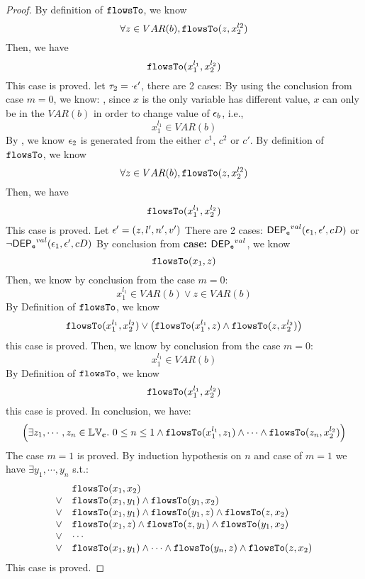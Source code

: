 \begin{proof}
 By definition of $\mathtt{flowsTo}$, we know
 \[
 \forall z \in VAR(b), \mathtt{flowsTo}(z, x_2^{l2})
 \]
 Then, we have
 \[
 \mathtt{flowsTo}(x_1^{l_1}, x_2^{l_2})
 \]
 This case is proved.
%
 let $\mathtt{\tau}_2 = \cdot \mathtt{\epsilon}'$, there are 2 cases:
By using the conclusion from case $m = 0$, we know:
, since $x$ is the only variable has different value, $x$ can only be in the $VAR(b)$ in order to change value of $\mathtt{\epsilon}_b$, i.e.,
 \[
 x_1^{l_1} \in VAR(b)
 \]
 By , we know $\mathtt{\epsilon}_2$ is generated from the either $c^1$, $c^2$ or $c'$.
 By definition of $\mathtt{flowsTo}$, we know
 \[
 \forall z \in VAR(b), \mathtt{flowsTo}(z, x_2^{l2})
 \]
 Then, we have
 \[
 \mathtt{flowsTo}(x_1^{l_1}, x_2^{l_2})
 \]
  This case is proved.
%
Let $\mathtt{\epsilon}' = (z, l', n', v')$
There are 2 cases:
$\mathsf{DEP_{\mathtt{e}}}^{val}(\mathtt{\epsilon}_1, \mathtt{\epsilon}', c D)$ or $\neg \mathsf{DEP_{\mathtt{e}}}^{val}(\mathtt{\epsilon}_1, \mathtt{\epsilon}', c D)$
%
%
By conclusion from \textbf{case: $\mathsf{DEP_{\mathtt{e}}}^{val}$}, we know
\[
  \mathtt{flowsTo}(x_1, z)
\]
Then, we know by conclusion from the case $m = 0$:
\[
  x_1^{l_1} \in VAR(b) \lor z \in VAR(b)
\]
%
By Definition of $\mathtt{flowsTo}$, we know
\[
  \mathtt{flowsTo}(x_1^{l_1}, x_2^{l_2}) \lor 
  \big(\mathtt{flowsTo}(x_1^{l_1}, z) \land \mathtt{flowsTo}(z, x_2^{l_2}) \big)
\]
this case is proved.
%
Then, we know by conclusion from the case $m = 0$:
\[
  x_1^{l_1} \in VAR(b)
\]
%
By Definition of $\mathtt{flowsTo}$, we know
\[
  \mathtt{flowsTo}(x_1^{l_1}, x_2^{l_2}) 
\]
this case is proved.
%
In conclusion, we have:
\[
  \Big( \exists z_1, \cdots, z_n \in \mathbb{LV}_{{\boldsymbol{\mathbf{c}}}}. ~ 0 \leq n \leq 1 \land
  \mathtt{flowsTo}(x_1^{l_1}, z_1) 
  \land \cdots \land \mathtt{flowsTo}(z_n, x_2^{l_2}) \Big)
\]
The case $m = 1$ is proved.
%
By induction hypothesis on $n$ and case of $m = 1$ we have $\exists y_1, \cdots, y_n$ s.t.:
\[
\begin{array}{ll}
      & \mathtt{flowsTo}(x_1, x_2) \\
  \lor  & \mathtt{flowsTo}(x_1, y_1) \land \mathtt{flowsTo}(y_1, x_2)\\
  \lor  & \mathtt{flowsTo}(x_1, y_1) \land \mathtt{flowsTo}(y_1, z) \land \mathtt{flowsTo}(z, x_2) \\
  \lor  & \mathtt{flowsTo}(x_1, z) \land \mathtt{flowsTo}(z, y_1) \land \mathtt{flowsTo}(y_1, x_2) \\
  \lor  & \cdots \\
  \lor  & \mathtt{flowsTo}(x_1, y_1) \land \cdots \land \mathtt{flowsTo}(y_n, z) \land \mathtt{flowsTo}(z, x_2) \\
\end{array}
\]
This case is proved.
\end{proof}